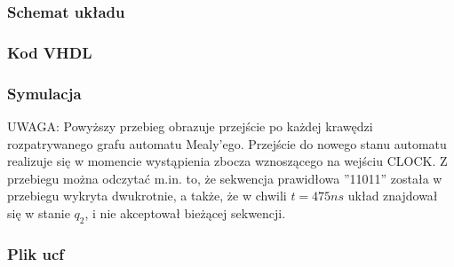 \documentclass[a4paper,12pt]{extarticle}  %
\begin{document}
    \subsubsection{Schemat układu}
    \begin{figure}[H]
        \centering
    \end{figure}
    \subsubsection{Kod VHDL}
    
    \subsubsection{Symulacja}
    \begin{figure}[H]
        \centering
    \end{figure}
    UWAGA: Powyższy przebieg obrazuje przejście po każdej krawędzi rozpatrywanego grafu automatu Mealy'ego. Przejście do nowego stanu automatu realizuje się w momencie wystąpienia zbocza wznoszącego na wejściu CLOCK. Z przebiegu można odczytać m.in. to, że sekwencja prawidłowa ''11011'' została w przebiegu wykryta dwukrotnie, a także, że w chwili $t = 475 ns$ układ znajdował się w stanie $q_2$, i nie akceptował bieżącej sekwencji.
    \subsubsection{Plik ucf}
    
\end{document}

